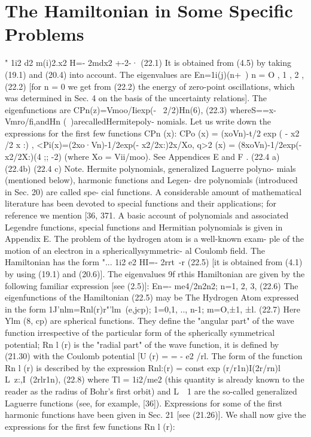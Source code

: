 \documentclass[a4paper,sfsidenotes,colorlinks=true]{tufte-book}
\numberwithin{equation}{section}
\numberwithin{figure}{section}
\begin{document}
{{{{\section{The Hamiltonian in Some Specific Problems}
"	1i2	d2	m(i)2.x2 H=- 2mdx2 +-2-·
(22.1) It is obtained from (4.5) by taking (19.1) and (20.4) into
account. The eigenvalues are
En=1i(j)(n+~)	n = O , 1 , 2 ,	(22.2)
[for n = 0 we get from (22.2) the energy of zero-point oscillations, which was determined in Sec. 4 on the basis of the uncertainty relations]. The eigenfunctions are
CPn(z)=Vmoo/Iiexp(- ~2/2)Hn(6),	(22.3)
whereS==x-Vmro/fi,andHn (~)arecalledHermitepoly- nomials. Let us write down the expressions for the first few functions CPn (x):
CPo (x) = (xoVn)-t/2 exp ( - x2 /2 x :) , <Pi(x)=(2xo·Vn)-1/2exp(- x2/2x:)2x/Xo,
q>2 (x) = (8xoVn)-1/2exp(-x2/2X:)(4 ;; -2)
(where Xo = Vii/moo). 	See	Appendices	E	and	F .
(22.4 a)
(22.4b)
(22.4 c)
Note. Hermite polynomials, generalized Laguerre polyno- mials (mentioned below), harmonic functions and Legen- dre polynomials (introduced in Sec. 20) are called spe- cial functions. A considerable amount of mathematical literature has been devoted to special functions and their applications; for reference we mention [36, 371. A basic account of polynomials and associated Legendre functions, special functions and Hermitian polynomials is given in Appendix E.
The problem of the hydrogen atom is a well-known exam- ple of the motion of an electron in a sphericallysymmetric- al Coulomb field. The Hamiltonian has the form
"...	1i2	e2 HI=- 2rrt~-r	(22.5)
[it is obtained from (4.1) by using (19.1) and (20.6)]. The eigenvalues 9f rthis Hamiltonian are given by the following familiar expression [see (2.5)]:
En=- me4/2n2n2;	n=1, 2, 3,	(22.6) The eigenfunctions of the Hamiltonian (22.5) may be
The Hydrogen Atom
expressed in the form 1J'nlm=Rnl(r)r"'lm~(e,jcp);	1=0,1, .., n-1;
m=O,±1, ±l.
(22.7)
Here Ylm (8, cp) are spherical functions. They define the "angular part" of the wave function irrespective of the particular form of the spherically symmetrical potential; Rn l (r) is the "radial part" of the wave function, it is defined by (21.30) with the Coulomb potential [U (r) =
= - e2 /rl. The form of the function Rn l (r) is described by the expression
Rnl:(r) = const exp (r/r1n)I(2r/r{n)l L~z:,I~(2rlr1n),	(22.8) where Tl = 1i2/me2 (this quantity is already known to the
reader as the radius of Bohr's first orbit) and L~~1 are the	so-called	generalized Laguerre	functions	(see,	for example, [36]). Expressions for some of the first harmonic functions have been given in Sec. 21 [see (21.26)]. We shall now give the expressions for the first few functions Rn l (r):
}}}}}
\end{document}
